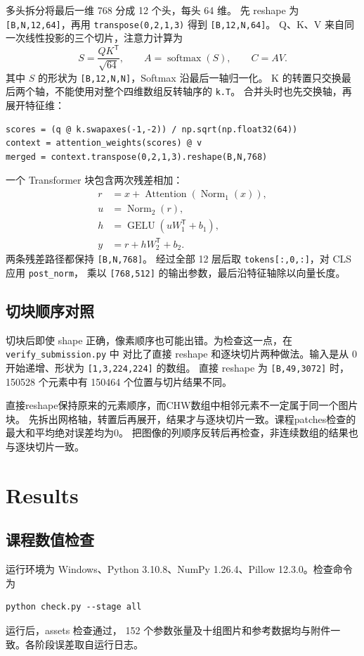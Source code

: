 \documentclass[a4paper,12pt]{article}
\newcommand{\shape}[1]{\texttt{#1}}
\newcommand{\file}[1]{\nolinkurl{#1}}
\begin{document}
多头拆分将最后一维 768 分成 12 个头，每头 64 维。
先 reshape 为 \shape{[B,N,12,64]}，再用 \file{transpose(0,2,1,3)} 得到 \shape{[B,12,N,64]}。
Q、K、V 来自同一次线性投影的三个切片，注意力计算为
\[
 S=\frac{QK^{\mathsf T}}{\sqrt{64}},\qquad
 A=\operatorname{softmax}(S),\qquad C=AV.
\]
其中 $S$ 的形状为 \shape{[B,12,N,N]}，Softmax 沿最后一轴归一化。
K 的转置只交换最后两个轴，不能使用对整个四维数组反转轴序的 \file{k.T}。
合并头时也先交换轴，再展开特征维：
\begin{lstlisting}
scores = (q @ k.swapaxes(-1,-2)) / np.sqrt(np.float32(64))
context = attention_weights(scores) @ v
merged = context.transpose(0,2,1,3).reshape(B,N,768)
\end{lstlisting}
一个 Transformer 块包含两次残差相加：
\begin{align*}
 r &= x+\operatorname{Attention}(\operatorname{Norm}_1(x)),\\
 u &= \operatorname{Norm}_2(r),\\
 h &= \operatorname{GELU}(uW_1^{\mathsf T}+b_1),\\
 y &= r+hW_2^{\mathsf T}+b_2.
\end{align*}
两条残差路径都保持 \shape{[B,N,768]}。
经过全部 12 层后取 \file{tokens[:,0,:]}，对 CLS 应用 \file{post_norm}，
乘以 \shape{[768,512]} 的输出参数，最后沿特征轴除以向量长度。
\subsection{切块顺序对照}
切块后即使 shape 正确，像素顺序也可能出错。为检查这一点，在 \file{verify_submission.py} 中
对比了直接 reshape 和逐块切片两种做法。输入是从 0 开始递增、形状为 \shape{[1,3,224,224]} 的数组。
直接 reshape 为 \shape{[B,49,3072]} 时，150528 个元素中有 150464 个位置与切片结果不同。

直接reshape保持原来的元素顺序，而CHW数组中相邻元素不一定属于同一个图片块。
先拆出网格轴，转置后再展开，结果才与逐块切片一致。课程patches检查的最大和平均绝对误差均为0。
把图像的列顺序反转后再检查，非连续数组的结果也与逐块切片一致。

\section{Results}
\subsection{课程数值检查}
运行环境为 Windows、Python 3.10.8、NumPy 1.26.4、Pillow 12.3.0。检查命令为
\begin{lstlisting}
python check.py --stage all
\end{lstlisting}
运行后，assets 检查通过，
152 个参数张量及十组图片和参考数据均与附件一致。各阶段误差取自运行日志。
\end{document}
